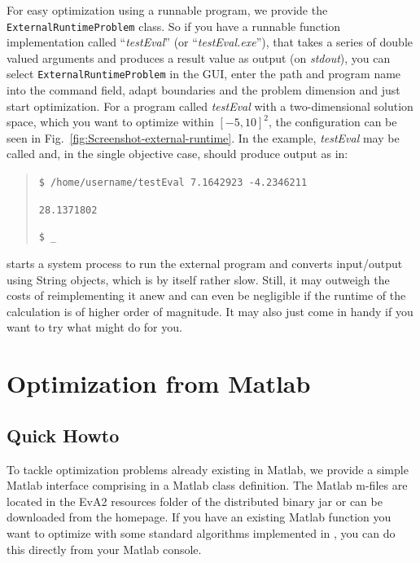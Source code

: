 For easy optimization using a runnable program, we provide the \texttt{ExternalRuntimeProblem}
class. So if you have a runnable function implementation called ``\emph{testEval}''
(or ``\emph{testEval.exe}''), that takes a series of double valued
arguments and produces a result value as output (on \textit{stdout}),
you can select \texttt{ExternalRuntimeProblem} in the GUI, enter the
path and program name into the command field, adapt boundaries and
the problem dimension and just start optimization. For a program
called \textit{testEval} with a two-dimensional solution space, which
you want to optimize within $[-5,10]^{2}$, the configuration can
be seen in Fig.~\ref{fig:Screenshot-external-runtime}. In the example,
\textit{testEval} may be called and, in the single objective case,
should produce output as in:
\begin{quotation}
\begin{flushleft}
\texttt{\$ /home/username/testEval 7.1642923 -4.2346211}
\par\end{flushleft}

\begin{flushleft}
\texttt{28.1371802}
\par\end{flushleft}

\begin{flushleft}
\texttt{\$ \_}
\par\end{flushleft}
\end{quotation}
 starts a system process to run the external program and
converts input/output using String objects, which is by itself rather
slow. Still, it may outweigh the costs of reimplementing it anew and
can even be negligible if the runtime of the calculation is of higher
order of magnitude. It may also just come in handy if you want to
try what  might do for you.


\section{Optimization from Matlab\label{sub:Optimization-from-Matlab}}


\subsection{Quick Howto\label{sub:JEInterface-Quick-Intro}}

To tackle optimization problems already existing in Matlab, we provide
a simple Matlab interface comprising in a Matlab class definition.
The Matlab m-files are located in the EvA2 resources folder of the
distributed binary jar or can be downloaded from the homepage. If
you have an existing Matlab function you want to optimize with some
standard algorithms implemented in , you can do this directly
from your Matlab console. 

